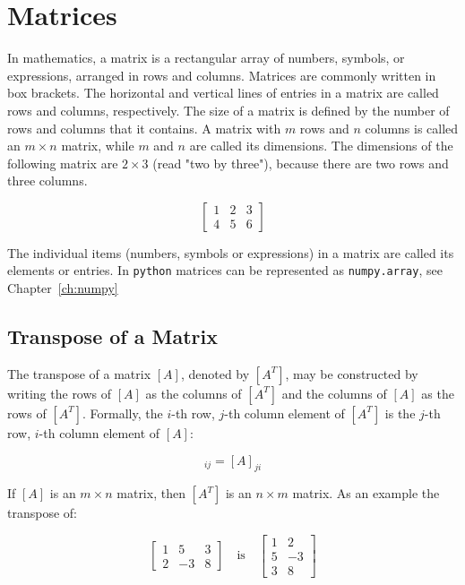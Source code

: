 \chapter{Matrices}
\label{sec:matrices}

In mathematics, a matrix is a rectangular array of numbers, symbols, or expressions, arranged in rows and columns. Matrices are commonly written in box brackets. The horizontal and vertical lines of entries in a matrix are called rows and columns, respectively. The size of a matrix is defined by the number of rows and columns that it contains. A matrix with $m$ rows and $n$ columns is called an $m\times n$ matrix, while $m$ and $n$ are called its dimensions. The dimensions of the following matrix are $2\times 3$ (read "two by three"), because there are two rows and three columns.

\begin{equation*}
\begin{bmatrix}
1 & 2 & 3\\
4 & 5 & 6
\end{bmatrix}
\end{equation*}

The individual items (numbers, symbols or expressions) in a matrix are called its elements or entries. 
In \texttt{python} matrices can be represented as \texttt{numpy.array}, see Chapter~\ref{ch:numpy}

\section{Transpose of a Matrix}
The transpose of a matrix $[A]$, denoted by $[A^T]$, may be constructed by writing the rows of $[A]$ as the columns of $[A^T]$
and the columns of $[A]$ as the rows of $[A^T]$.
Formally, the $i$-th row, $j$-th column element of $[A^T]$ is the $j$-th row, $i$-th column element of $[A]$:

\begin{equation}[A^T]_{ij} = [A]_{ji}\end{equation}

If $[A]$ is an $m\times n$ matrix, then $[A^T]$ is an $n\times m$ matrix. 
As an example the transpose of:

\begin{equation*}
\begin{bmatrix}
1 & 5 & 3 \\
2 & -3 & 8
\end{bmatrix}
\quad \mathrm{is} \quad
\begin{bmatrix}
1 & 2 \\
5 & -3 \\
3  & 8
\end{bmatrix}
\end{equation*}

